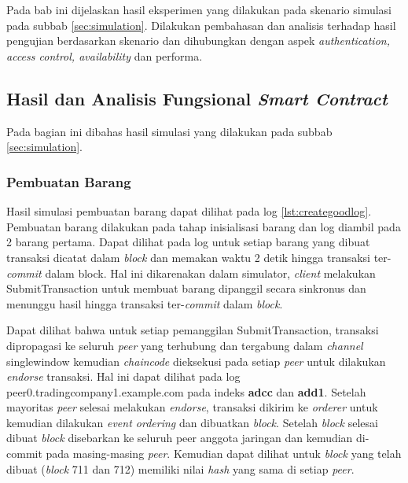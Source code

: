 \chapter{\babLima}
\label{bab:5}
Pada bab ini dijelaskan hasil eksperimen yang dilakukan pada skenario simulasi pada subbab \ref{sec:simulation}. Dilakukan pembahasan dan analisis terhadap hasil pengujian berdasarkan skenario dan dihubungkan dengan aspek \textit{authentication, access control, availability} dan performa.

\section{Hasil dan Analisis Fungsional \textit{Smart Contract}}
Pada bagian ini dibahas hasil simulasi yang dilakukan pada subbab \ref{sec:simulation}. 

\subsection{Pembuatan Barang}
\label{subsec:creategood-chap5}
Hasil simulasi pembuatan barang dapat dilihat pada log \ref{lst:creategoodlog}. Pembuatan barang dilakukan pada tahap inisialisasi barang dan log diambil pada 2 barang pertama. Dapat dilihat pada log untuk setiap barang yang dibuat transaksi dicatat dalam \textit{block} dan memakan waktu 2 detik hingga transaksi ter-\textit{commit} dalam block. Hal ini dikarenakan dalam simulator, \textit{client} melakukan SubmitTransaction untuk membuat barang dipanggil secara sinkronus dan menunggu hasil hingga transaksi ter-\textit{commit} dalam \textit{block}. 



Dapat dilihat bahwa untuk setiap pemanggilan SubmitTransaction, transaksi dipropagasi ke seluruh \textit{peer} yang terhubung dan tergabung dalam \textit{channel} singlewindow kemudian \textit{chaincode} dieksekusi pada setiap \textit{peer} untuk dilakukan \textit{endorse} transaksi. Hal ini dapat dilihat pada log peer0.tradingcompany1.example.com pada indeks \textbf{adcc} dan \textbf{add1}. Setelah mayoritas \textit{peer} selesai melakukan \textit{endorse}, transaksi dikirim ke \textit{orderer} untuk kemudian dilakukan \textit{event ordering} dan dibuatkan \textit{block}. Setelah \textit{block} selesai dibuat \textit{block} disebarkan ke seluruh peer anggota jaringan dan kemudian di-commit pada masing-masing \textit{peer}. Kemudian dapat dilihat untuk \textit{block} yang telah dibuat (\textit{block} 711 dan 712) memiliki nilai \textit{hash} yang sama di setiap \textit{peer}.

